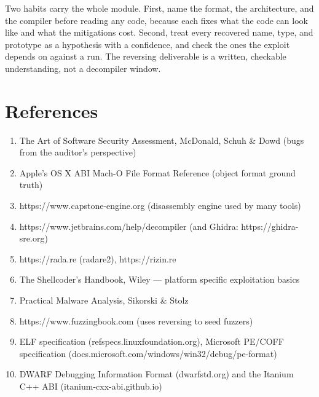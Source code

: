 \documentclass[12pt]{Training}
\begin{document}
Two habits carry the whole module. First, name the format, the architecture, and the compiler before reading any code, because each fixes what the code can look like and what the mitigations cost. Second, treat every recovered name, type, and prototype as a hypothesis with a confidence, and check the ones the exploit depends on against a run. The reversing deliverable is a written, checkable understanding, not a decompiler window.

\section*{References}
\begin{enumerate}
	\item The Art of Software Security Assessment, McDonald, Schuh \& Dowd (bugs from the auditor's perspective)
	\item Apple's OS X ABI Mach-O File Format Reference (object format ground truth)
	\item https://www.capstone-engine.org (disassembly engine used by many tools)
	\item https://www.jetbrains.com/help/decompiler (and Ghidra: https://ghidra-sre.org)
	\item https://rada.re (radare2), https://rizin.re
	\item The Shellcoder's Handbook, Wiley --- platform specific exploitation basics
	\item Practical Malware Analysis, Sikorski \& Stolz
	\item https://www.fuzzingbook.com (uses reversing to seed fuzzers)
	\item ELF specification (refspecs.linuxfoundation.org), Microsoft PE/COFF specification (docs.microsoft.com/windows/win32/debug/pe-format)
	\item DWARF Debugging Information Format (dwarfstd.org) and the Itanium C++ ABI (itanium-cxx-abi.github.io)
\end{enumerate}
\end{document}
